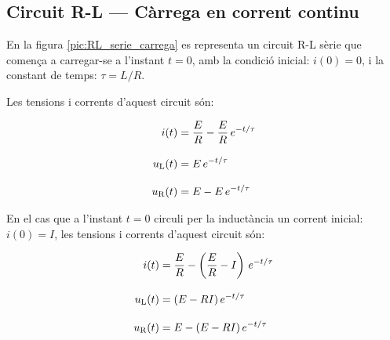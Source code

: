 \subsection{Circuit R-L --- Càrrega en corrent continu}\label{sec:RL-carrega}

En la figura \vref{pic:RL_serie_carrega} es representa un circuit R-L sèrie que comença a carregar-se a l'instant $t=0$, amb la condició inicial: $i(0) = 0$, i la constant de temps: $\tau = L/R$.
\begin{center}
    
    \label{pic:RL_serie_carrega}
\end{center}

Les tensions i corrents d'aquest circuit són:

\hfill
\begin{minipage}[b]{9cm}
    
\end{minipage}
\hfill
\begin{minipage}[b]{6cm}
    \begin{align}
        i(t) &= \frac{E}{R}  - \frac{E}{R} \,e^{-t/\tau}\label{eq:RL-i-carrega} \\[3mm]
        u_\mathrm{L}(t) &= E\,e^{-t/\tau}\label{eq:RL-ul-carrega} \\[3mm]
        u_\mathrm{R}(t) &= E - E\,e^{-t/\tau}
    \end{align}
\end{minipage}

\vspace{5mm}
En el cas que a l'instant $t=0$ circuli per la inductància un corrent inicial: $i(0) = I$, les tensions i corrents d'aquest circuit són:

\hfill
\begin{minipage}[b]{9cm}
    
\end{minipage}
\hfill
\begin{minipage}[b]{6cm}
    \begin{align}
        i(t) &= \frac{E}{R}  - \left(\frac{E}{R}-I\right) \,e^{-t/\tau}\label{eq:RL-i-carrega-ini} \\[3mm]
        u_\mathrm{L}(t) &= (E- R I)\,e^{-t/\tau}\label{eq:RL-ul-carrega-ini} \\[3mm]
        u_\mathrm{R}(t) &= E - (E-R I)\,e^{-t/\tau}
    \end{align}
\end{minipage}


